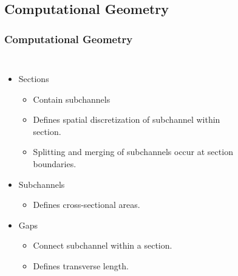 \documentclass[compress,xcolor=table]{beamer}
\begin{document}
\subsection[Computational Geometry]{Computational Geometry}
\begin{frame}
\frametitle{Computational Geometry}
\begin{columns}

\begin{itemize}
\item{Sections
\begin{itemize}
\item{Contain subchannels}
\item{Defines spatial discretization of subchannel within section.}
\item{Splitting and merging of subchannels occur at section boundaries.}
\end{itemize}
}
\item{Subchannels
\begin{itemize}
\item{Defines cross-sectional areas.}
\end{itemize}
}
\item{Gaps
\begin{itemize}
\item{Connect subchannel within a section.}
\item{Defines transverse length.}
\end{itemize}
}
\end{itemize}

\begin{figure}[t]
\centering
\resizebox{!}{0.7\textheight}{

}
\end{figure}

\end{columns}

\end{frame}
\end{document}
